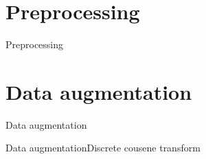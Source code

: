 \documentclass[aspectratio=169]{beamer}
\begin{document}
\section{Preprocessing}
\begin{frame}{Preprocessing}
    
\end{frame}

\section{Data augmentation}
\begin{frame}{Data augmentation}
    
\end{frame}

\begin{frame}{Data augmentation}{Discrete cousene transform}
    
\end{frame}
\end{document}
